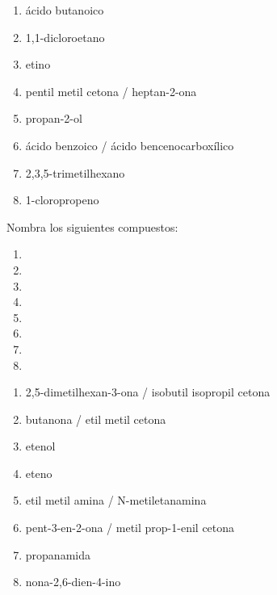 \begin{solution}
  \begin{enumerate}
    \item ácido butanoico
    \item 1,1-dicloroetano
    \item etino
    \item pentil metil cetona / heptan-2-ona
    \item propan-2-ol
    \item ácido benzoico / ácido bencenocarboxílico
    \item 2,3,5-trimetilhexano
    \item 1-cloropropeno
  \end{enumerate}
\end{solution}


\begin{exercise}[
    tags    = {orgánica,formulación,múltiple,2B},
    topics  = {química orgánica,formulación,nomenclatura},
    source  = {Química 2B SAN 2016, p391, e13},
  ]
  Nombra los siguientes compuestos:

  \begin{enumerate}
    \item {}
    \item {}
    \item {}
    \item {}
    \item {}
    \item {}
    \item {}
    \item {}
  \end{enumerate}
\end{exercise}

\begin{solution}
  \begin{enumerate}
    \item 2,5-dimetilhexan-3-ona / isobutil isopropil cetona
    \item butanona / etil metil cetona
    \item etenol
    \item eteno
    \item etil metil amina / N-metiletanamina
    \item pent-3-en-2-ona / metil prop-1-enil cetona
    \item propanamida
    \item nona-2,6-dien-4-ino
  \end{enumerate}
\end{solution}

